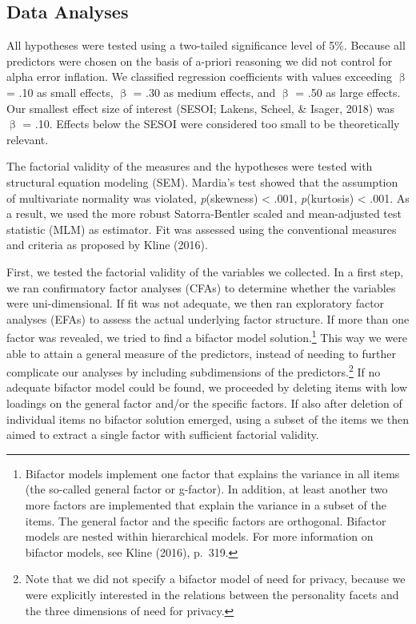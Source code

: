 \documentclass[man,floatsintext]{apa6}
\let\rmarkdownfootnote\footnote%
\def\footnote{\protect\rmarkdownfootnote}
\begin{document}
\hypertarget{data-analyses}{%
\subsection{Data Analyses}\label{data-analyses}}

All hypotheses were tested using a two-tailed significance level of 5\%. Because all predictors were chosen on the basis of a-priori reasoning we did not control for alpha error inflation. We classified regression coefficients with values exceeding \textbar{}\(\upbeta\)\textbar{} = .10 as small effects, \textbar{}\(\upbeta\)\textbar{} = .30 as medium effects, and \textbar{}\(\upbeta\)\textbar{} = .50 as large effects. Our smallest effect size of interest (SESOI; Lakens, Scheel, \& Isager, 2018) was \textbar{}\(\upbeta\)\textbar{} = .10. Effects below the SESOI were considered too small to be theoretically relevant.

The factorial validity of the measures and the hypotheses were tested with structural equation modeling (SEM). Mardia's test showed that the assumption of multivariate normality was violated, \emph{p}(skewness) \textless{} .001, \emph{p}(kurtosis) \textless{} .001. As a result, we used the more robust Satorra-Bentler scaled and mean-adjusted test statistic (MLM) as estimator. Fit was assessed using the conventional measures and criteria as proposed by Kline (2016).

First, we tested the factorial validity of the variables we collected. In a first step, we ran confirmatory factor analyses (CFAs) to determine whether the variables were uni-dimensional. If fit was not adequate, we then ran exploratory factor analyses (EFAs) to assess the actual underlying factor structure. If more than one factor was revealed, we tried to find a bifactor model solution.\footnote{Bifactor models implement one factor that explains the variance in all items (the so-called general factor or g-factor). In addition, at least another two more factors are implemented that explain the variance in a subset of the items. The general factor and the specific factors are orthogonal. Bifactor models are nested within hierarchical models. For more information on bifactor models, see Kline (2016), p.~319.} This way we were able to attain a general measure of the predictors, instead of needing to further complicate our analyses by including subdimensions of the predictors.\footnote{Note that we did not specify a bifactor model of need for privacy, because we were explicitly interested in the relations between the personality facets and the three dimensions of need for privacy.} If no adequate bifactor model could be found, we proceeded by deleting items with low loadings on the general factor and/or the specific factors. If also after deletion of individual items no bifactor solution emerged, using a subset of the items we then aimed to extract a single factor with sufficient factorial validity.
\end{document}
